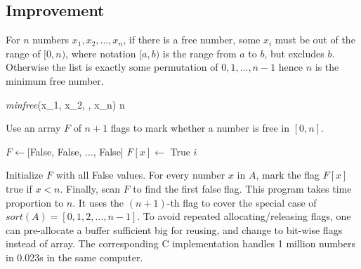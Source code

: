 \documentclass[b5paper]{article}
\begin{document}
\subsection*{Improvement}
For $n$ numbers $x_1, x_2, \dotsc, x_n$, if there is a free number, some $x_i$ must be out of the range of $[0, n)$, where notation $[a, b)$ is the range from $a$ to $b$, but excludes $b$. Otherwise the list is exactly some permutation of $0, 1, \dotsc, n - 1$ hence $n$ is the minimum free number.

\be
\textit{minfree}(x_1, x_2, \dotsc, x_n) \leq n
\label{eq:min-free}
\ee

Use an array $F$ of $n + 1$ flags to mark whether a number is free in $[0, n]$.

\begin{algorithmic}[1]
  \State $F \gets $[False, False, $\dotsc$, False] 
      \State $F[x] \gets$ True
    \EndIf
  \EndFor
      \State \Return $i$
    \EndIf
  \EndFor
\EndFunction
\end{algorithmic}

Initialize $F$ with all False values. For every number $x$ in $A$, mark the flag $F[x]$ true if $x < n$. Finally, scan $F$ to find the first false flag. This program takes time proportion to $n$. It uses the $(n + 1)$-th flag to cover the special case of $sort(A) = [0, 1, 2, \dotsc, n-1]$. To avoid repeated allocating/releasing flags, one can pre-allocate a buffer sufficient big for reusing, and change to bit-wise flags instead of array. The corresponding C implementation handles 1 million numbers in 0.023s in the same computer.





\end{document}
